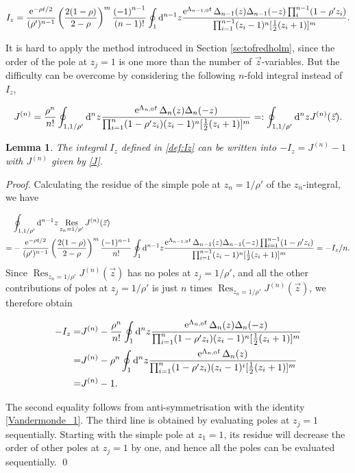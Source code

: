 \documentclass[cmp]{svjour}
\numberwithin{theorem}{section}
\numberwithin{equation}{section}
\DeclareMathOperator{\e}{e}
\def\dd{{\rm d}}
\DeclareMathOperator{\res}{Res}
\newtheorem{lemman}[theorem]{Lemma}
\begin{document}
\begin{align*}
I_z
= 
\frac{\e^{-\rho t/2}}{(\rho')^{n-1}} \left(\frac{2( 1- \rho)}{2 - \rho}\right)^m  \frac{{(-1)}^{n-1}}{(n-1)!}
\oint_{1}\dd^{n-1}z
\frac{\e^{\Lambda_{n-1,0} t}
\Delta_{n-1}(z) \Delta_{n-1}(-z)
\prod_i^{n-1}(1-\rho'z_i)}
{\prod_{i=1}^{n-1}(z_i-1)^{n}
[\frac{1}{2}(z_i+1)]^m}.
\end{align*}

It is hard to apply the method introduced in Section \ref{se:tofredholm}, since the order of the pole at $z_j=1$ is one more than the number of $\vec{z}$-variables. 
But the difficulty can be overcome by 
considering the following $n$-fold integral instead of $I_z$,

\begin{equation}
\label{J}
J^{(n)}
=
\frac{\rho^n}{n!}
\oint_{1,1/\rho'}\dd^{n}z
\frac{\e^{\Lambda_{n,0} t}
\Delta_{n}(z)\Delta_n(-z) }
{\prod_{i=1}^{n}(1-\rho'z_i)(z_i-1)^{n}
[\frac{1}{2}(z_i+1)]^m} =: \oint_{1,1/\rho'}\dd^{n}z J^{(n)}(\vec{z}).
\end{equation}

\begin{lemman}
\label{lem:rewritingI_z}
The integral $I_z$ defined in \eqref{def:Iz} can be written into $-I_z=J^{(n)}-1$ with $J^{(n)}$ given by \eqref{J}.
\end{lemman}
\begin{proof}

Calculating the residue of the simple pole at $z_{n}=1/\rho'$ of the $z_n$-integral, we have 


\begin{align*}
& \oint_{1,1/\rho'} \dd^{n-1}z  \res_{z_n=1/\rho'}J^{(n)}(\vec{z})\\
=&
-\frac{\e^{-\rho t/2}}{(\rho')^{n-1}} \left(\frac{2( 1- \rho)}{2 - \rho}\right)^m \frac{(-1)^{n-1}}{n!} \oint_{1} \dd^{n-1}z
\frac{\e^{\Lambda_{n-1,0} t}
\Delta_{n-1}(z) \Delta_{n-1}(-z)
\prod_{i=1}^{n-1}(1-\rho'z_i)}
{\prod_{i=1}^{n-1}(z_i-1)^{n}
[\frac{1}{2}(z_i+1)]^m} = - I_z/n.
\end{align*}
Since $\res_{z_n=1/\rho'}J^{(n)}(\vec{z})$ has no poles at $z_j=1/\rho'$, and all the other contributions of poles at $z_j=1/\rho'$ is just $n$ times $\res_{z_n=1/\rho'}J^{(n)}(\vec{z})$, we therefore obtain

\begin{align}
\nonumber
-I_z
=&
J^{(n)}-\frac{\rho^n}{n!}
\oint_{1}\dd^{n}z
\frac{\e^{\Lambda_{n,0} t}
\Delta_{n}(z)\Delta_n(-z) }
{\prod_{i=1}^{n}(1-\rho'z_i)(z_i-1)^{n}
[\frac{1}{2}(z_i+1)]^m}
\\
\nonumber
=&
J^{(n)}-\rho^n
\oint_{1}\dd^{n}z
\frac{\e^{\Lambda_{n,0} t}
\Delta_{n}(z)}
{\prod_{i=1}^{n}(1-\rho'z_i)(z_i-1)^{i}
[\frac{1}{2}(z_i+1)]^m}
\\
=&
J^{(n)}-1 \nonumber
\label{Iz=J-1}.
\end{align}

The second equality follows from anti-symmetrisation with the identity \eqref{Vandermonde_1}. The third line is obtained by evaluating poles at $z_j=1$ sequentially. Starting with the simple pole at $z_1=1$, its residue will decrease the order of other poles at $z_j=1$ by one, and hence all the poles can be evaluated sequentially. \qed 
\end{proof}
\end{document}
